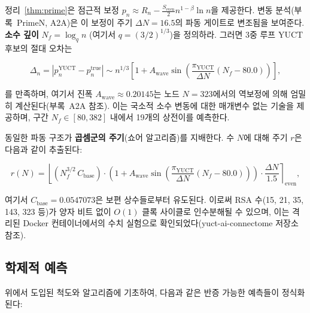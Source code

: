 \documentclass[12pt,a4paper]{article}
\theoremstyle{remark}
\newcommand{\piYUCT}{\pi_{\mathrm{YUCT}}}
\begin{document}
	정리~\ref{thm:prime}은 점근적 보정 \(p_n \approx R_n - \frac{S_{\mathrm{even}}}{2} n^{1-\beta}\ln n\)을 제공한다. 변동 분석(부록~PrimeN, A2A)은 이 보정이 주기 \(\Delta N = 16.5\)의 파동 게이트로 변조됨을 보여준다. \textbf{소수 깊이} \(N_f = \log_q n\) (여기서 \(q = (3/2)^{1/3}\))을 정의하라. 그러면 3중 루프 YUCT 후보의 절대 오차는
	
	\begin{equation}
		\Delta_n = \left| p_n^{\mathrm{YUCT}} - p_n^{\mathrm{true}} \right|
		\sim n^{1/3} \left[ 1 + A_{\text{wave}} \sin\!\left( \frac{\piYUCT}{\Delta N} (N_f - 80.0) \right) \right],
		\label{eq:prime_wave}
	\end{equation}
	
	를 만족하며, 여기서 진폭 \(A_{\text{wave}} \approx 0.20145\)는 노드 \(N=323\)에서의 역보정에 의해 엄밀히 계산된다(부록~A2A 참조). 이는 국소적 소수 변동에 대한 매개변수 없는 기술을 제공하며, 구간 \(N_f \in [80, 382]\) 내에서 19개의 상전이를 예측한다.
	
	동일한 파동 구조가 \textbf{곱셈군의 주기}(쇼어 알고리즘)를 지배한다. 수 \(N\)에 대해 주기 \(r\)은 다음과 같이 추출된다:
	
	\begin{equation}
		r(N) = \left\lfloor (N_f^{3/2} \, C_{\text{base}}) \cdot
		\left(1 + A_{\text{wave}} \sin\left( \frac{\piYUCT}{\Delta N} (N_f - 80.0) \right) \right) \cdot \frac{\Delta N}{1.5} \right\rceil_{\text{even}},
		\label{eq:shor_period}
	\end{equation}
	
	여기서 \(C_{\text{base}} = 0.0547073\)은 보편 상수들로부터 유도된다. 이로써 RSA 수(15, 21, 35, 143, 323 등)가 양자 비트 없이 \(O(1)\) 클록 사이클로 인수분해될 수 있으며, 이는 격리된 Docker 컨테이너에서의 수치 실험으로 확인되었다(yuct-ai-connectome 저장소 참조).
	
	\subsection{학제적 예측}
	\label{subsec:predictions-complexity}
	
	위에서 도입된 척도와 알고리즘에 기초하여, 다음과 같은 반증 가능한 예측들이 정식화된다:
	
\end{document}

